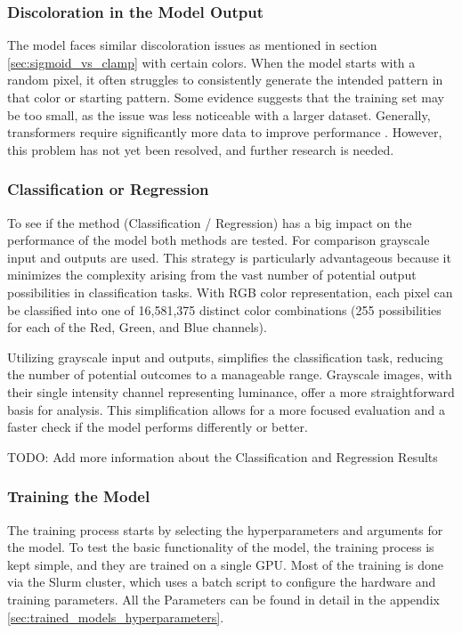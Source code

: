     \subsubsection{Discoloration in the Model Output}
    
    The model faces similar discoloration issues as mentioned in section \autoref{sec:sigmoid_vs_clamp} with certain colors. When the model starts with a random pixel, it often struggles to consistently generate the intended pattern in that color or starting pattern. Some evidence suggests that the training set may be too small, as the issue was less noticeable with a larger dataset. Generally, transformers require significantly more data to improve performance \autocite{chen2022dearkd}. However, this problem has not yet been resolved, and further research is needed.

    \subsubsection{Classification or Regression}

    To see if the method (Classification / Regression) has a big impact on the performance of the model both methods are tested. For comparison grayscale input and outputs are used. This strategy is particularly advantageous because it minimizes the complexity arising from the vast number of potential output possibilities in classification tasks. With RGB color representation, each pixel can be classified into one of 16,581,375 distinct color combinations (255 possibilities for each of the Red, Green, and Blue channels).

    Utilizing grayscale input and outputs, simplifies the classification task, reducing the number of potential outcomes to a manageable range. Grayscale images, with their single intensity channel representing luminance, offer a more straightforward basis for analysis. This simplification allows for a more focused evaluation and a faster check if the model performs differently or better.

    TODO: Add more information about the Classification and Regression Results
        

    \subsubsection{Training the Model}

    The training process starts by selecting the hyperparameters and arguments for the model. To test the basic functionality of the model, the training process is kept simple, and they are trained on a single GPU. Most of the training is done via the Slurm cluster, which uses a batch script to configure the hardware and training parameters. All the Parameters can be found in detail in the appendix \autoref{sec:trained_models_hyperparameters}.
    
